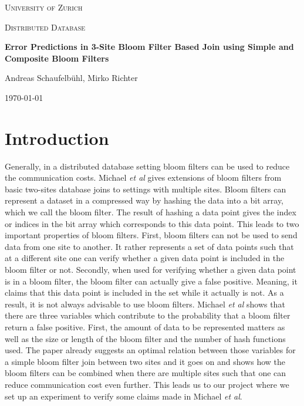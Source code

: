 \documentclass[12]{scrartcl}
\begin{document}
\begin{titlepage}
	\centering
	{\scshape\LARGE University of Zurich\par}
	\vspace{1cm}
	{\scshape\Large Distributed Database\par}
	\vspace{1.5cm}
	{\huge\bfseries Error Predictions in 3-Site Bloom Filter Based Join using Simple and Composite Bloom Filters\par}
	\vspace{2cm}
	{\Large Andreas Schaufelbühl, Mirko Richter\par}
	\vfill
	
	{\large \today\par}
\end{titlepage}

\tableofcontents
\listoffigures
\newpage
	
\section{Introduction}
 Generally, in a distributed database setting bloom filters can be used to reduce the communication costs. Michael {\em et al}\cite{michael} gives extensions of bloom filters from basic two-sites database joins to settings with multiple sites. Bloom filters can represent a dataset in a compressed way by hashing the data into a bit array, which we call the bloom filter. The result of hashing a data point gives the index or indices in the bit array which corresponds to this data point. This leads to two important properties of bloom filters. First, bloom filters can not be used to send data from one site to another. It rather represents a set of data points such that at a different site one can verify whether a given data point is included in the bloom filter or not. Secondly, when used for verifying whether a given data point is in a bloom filter, the bloom filter can actually give a false positive. Meaning, it claims that this data point is included in the set while it actually is not. As a result, it is not always advisable to use bloom filters. Michael {\em et al}\cite{michael} shows that there are three variables which contribute to the probability that a bloom filter return a false positive. First, the amount of data to be represented matters as well as the size or length of the bloom filter and the number of hash functions used. The paper already suggests an optimal relation between those variables for a simple bloom filter join between two sites and it goes on and shows how the bloom filters can be combined when there are multiple sites such that one can reduce communication cost even further. This leads us to our project where we set up an experiment to verify some claims made in Michael {\em et al}\cite{michael}.
\end{document}
